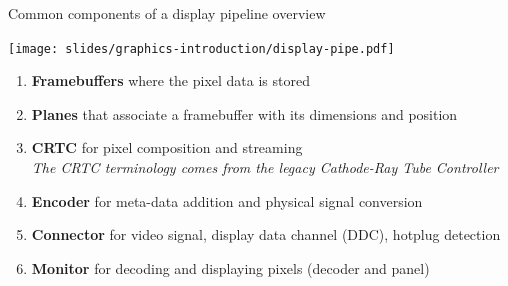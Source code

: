 \begin{frame}{Common components of a display pipeline overview}
  \begin{center}
  \texttt{[image: slides/graphics-introduction/display-pipe.pdf]}
  \end{center}

  \begin{enumerate}
  \item \textbf{Framebuffers} where the pixel data is stored
  \item \textbf{Planes} that associate a framebuffer with its dimensions and position
  \item \textbf{CRTC} for pixel composition and streaming\\
  \textit{The CRTC terminology comes from the legacy Cathode-Ray Tube Controller}
  \item \textbf{Encoder} for meta-data addition and physical signal conversion
  \item \textbf{Connector} for video signal, display data channel (DDC), hotplug detection
  \item \textbf{Monitor} for decoding and displaying pixels (decoder and panel)
  \end{enumerate}
\end{frame}


